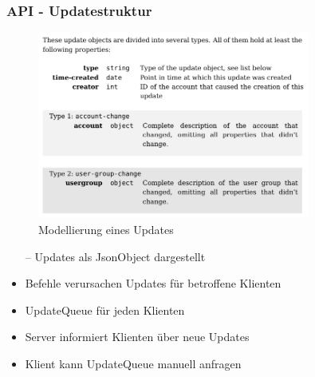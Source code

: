 \documentclass[aspectratio=1610]{beamer}
\begin{document}
		\begin{frame}[plain]
			\frametitle{API - Updatestruktur}
			\begin{minipage}{0.5\textwidth}
			\begin{figure}[h]
				\centering
				\includegraphics[width=0.8\textwidth]{images/Updates.png}
				\caption{Modellierung eines Updates}
			\end{figure}
			\end{minipage}%
			\begin{minipage}{0.5\textwidth}
			\begin{itemize}
				\item[--] Updates als JsonObject dargestellt
				\item<2->[--] Befehle verursachen Updates für betroffene Klienten
				\item<3->[--] UpdateQueue für jeden Klienten
				\item<4->[--] Server informiert Klienten über neue Updates
				\item<5->[--] Klient kann UpdateQueue manuell anfragen
			\end{itemize}
			\end{minipage}
	\end{frame}
\end{document}
